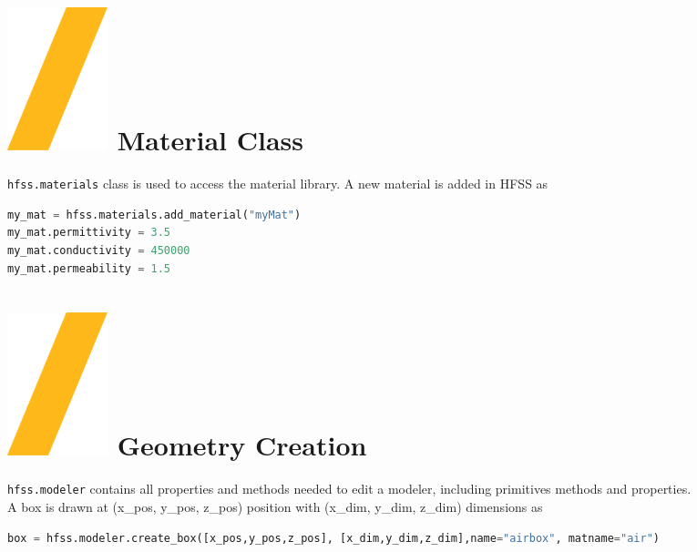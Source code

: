 \documentclass[9pt,landscape]{article}
\begin{document}
\begin{multicols}{3}
\section{\includegraphics[height=\fontcharht\font`\S]{slash.png} Material Class}
\texttt{hfss.materials} class is used to access the material library. A new material is added in HFSS as
\begin{lstlisting}[language=Python]
my_mat = hfss.materials.add_material("myMat")
my_mat.permittivity = 3.5
my_mat.conductivity = 450000
my_mat.permeability = 1.5
\end{lstlisting}

\section{\includegraphics[height=\fontcharht\font`\S]{slash.png} Geometry Creation}
\texttt{hfss.modeler} contains all properties and methods needed to edit a modeler, including primitives methods and properties.
\newline
\\
A box is drawn at (x\_pos, y\_pos, z\_pos) position with (x\_dim, y\_dim, z\_dim) dimensions as
\begin{lstlisting}[language=Python]
box = hfss.modeler.create_box([x_pos,y_pos,z_pos], [x_dim,y_dim,z_dim],name="airbox", matname="air")
\end{lstlisting}


\end{multicols}
\end{document}
